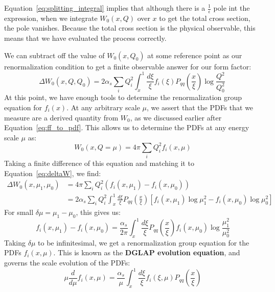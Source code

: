 \documentclass[11pt, oneside]{article}   	%
\theoremstyle{definition}
\begin{document}
Equation~\ref{eq:splitting_integral} implies that although there is a $\frac{1}{\epsilon}$ pole int the expression, when we integrate $W_0(x, Q)$ over 
$x$ to get the total cross section, the pole vanishes. Because the total cross section is the physical observable, this means that we have evaluated 
the process correctly. 

We can subtract off the value of $W_0(x, Q_0)$ at some reference point as our renormalization condition to get a finite observable answer for 
our form factor:
\begin{equation}
	\Delta W_0(x, Q, Q_0) = 2\alpha_s \sum_i Q_i^2\int_x^1 \frac{d\xi}{\xi}f_i(\xi)P_{qq}\left(\frac{x}{\xi}\right)\log\frac{Q^2}{Q_0^2}~
	\label{eq:deltaW}
\end{equation}
At this point, we have enough tools to determine the renormalization group equation for $f_i(x)$. At any arbitrary scale $\mu$, we assert that the 
PDFs that we measure are a derived quantity from $W_0$, as we discussed earlier after Equation~\ref{eq:ff_to_pdf}. This allows us to 
determine the PDFs at any energy scale $\mu$ as:
\begin{equation}
	W_0(x, Q = \mu) = 4\pi\sum_i Q_i^2 f_i(x, \mu)
\end{equation}
Taking a finite difference of this equation and matching it to Equation~\ref{eq:deltaW}, we find:
\begin{align}
	\Delta W_0(x, \mu_1, \mu_0) &= 4\pi\sum_i Q_i^2 (f_i(x, \mu_1) - f_i(x, \mu_0)) \\
	&= 2\alpha_s \sum_i Q_i^2\int_x^1 \frac{d\xi}{\xi}P_{qq}\left(\frac{x}{\xi}\right)
	\left[f_i(x, \mu_1)\log\mu_1^2 - f_i(x, \mu_0)\log\mu_0^2\right]
\end{align}
For small $\delta\mu = \mu_1 - \mu_0$, this gives us:
\begin{equation}
	f_i(x, \mu_1) - f_i(x, \mu_0) = \frac{\alpha_s}{2\pi}\int_x^1\frac{d\xi}{\xi} P_{qq}\left(\frac{x}{\xi}\right) f_i(x, \mu_0)\log\frac{\mu_1^2}{\mu_0^2}
\end{equation}
Taking $\delta\mu$ to be infinitesimal, we get a renormalization group equation for the PDFs $f_i(x, \mu)$. This is known as the \textbf{DGLAP 
evolution equation}, and governs the scale evolution of the PDFs:
\begin{equation}
	\mu\frac{d}{d\mu} f_i(x, \mu) = \frac{\alpha_s}{\mu}\int_x^1\frac{d\xi}{\xi} f_i(\xi, \mu) P_{qq}\left(\frac{x}{\xi}\right)
\end{equation}
\end{document}
